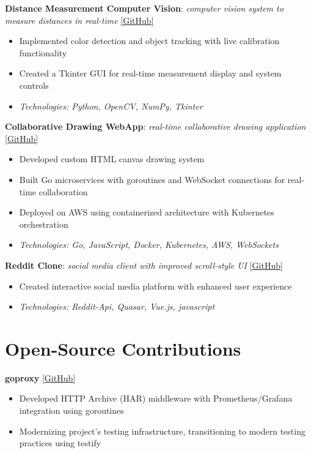 \documentclass[10pt,a4paper]{article}
\begin{document}
	
	\textbf{Distance Measurement Computer Vision}: \textit{computer vision system to measure distances in real-time} \href{https://github.com/CameronBadman/computer-vision}{[GitHub]}
	\begin{itemize}[label=\textbullet, itemsep=0.05cm]
		\item Implemented color detection and object tracking with live calibration functionality
		\item Created a Tkinter GUI for real-time measurement display and system controls
		\item \textit{Technologies: Python, OpenCV, NumPy, Tkinter}
	\end{itemize}
	
	\textbf{Collaborative Drawing WebApp}: \textit{real-time collaborative drawing application} \href{https://github.com/CameronBadman/Canvis-collab-webapp}{[GitHub]}
	\begin{itemize}[label=\textbullet, itemsep=0.05cm]
		\item Developed custom HTML canvas drawing system
		\item Built Go microservices with goroutines and WebSocket connections for real-time collaboration
		\item Deployed on AWS using containerized architecture with Kubernetes orchestration
		\item \textit{Technologies: Go, JavaScript, Docker, Kubernetes, AWS, WebSockets}
	\end{itemize}
	
	\textbf{Reddit Clone}: \textit{social media client with improved scroll-style UI} \href{https://github.com/CameronBadman/Reddit-Clone}{[GitHub]}
	\begin{itemize}[label=\textbullet, itemsep=0.05cm]
		\item Created interactive social media platform with enhanced user experience
		\item \textit{Technologies: Reddit-Api, Quasar, Vue.js, javascript}
	\end{itemize}
	
	\section{Open-Source Contributions}
	\textbf{goproxy} \href{https://github.com/elazarl/goproxy}{[GitHub]}
	\begin{itemize}[label=\textbullet, itemsep=0.02cm]
		\item Developed HTTP Archive (HAR) middleware with Prometheus/Grafana integration using goroutines
		\item Modernizing project's testing infrastructure, transitioning to modern testing practices using testify
	\end{itemize}
	
\end{document}
